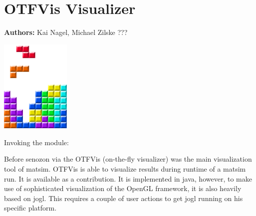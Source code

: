 \chapter{OTFVis Visualizer}
\label{ch:otfvis}

\hfill \textbf{Authors:} Kai Nagel, Michael Zilske ???

\begin{center} \includegraphics[width=0.25\textwidth, angle=0]{frontmatter/figures/MATSimBook.png} \end{center}


\begin{compactitem}
\item Invoking the module: 
\end{compactitem}

Before senozon via the OTFVis (on-the-fly visualizer) \citep[][]{Strippgen_PhDThesis_2009} was the main visualization tool of \gls{matsim}. OTFVis is able to visualize results during runtime of a \gls{matsim} run. It is available as a contribution. It is implemented in \gls{java}, however, to make use of sophisticated visualization of the OpenGL framework, it is also heavily based on jogl. This requires a couple of user actions to get jogl running on his specific platform. 







